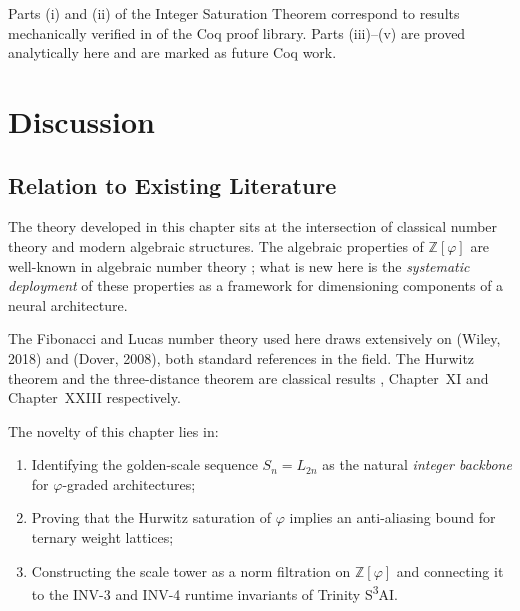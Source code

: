 \noindent
{}

\medskip
\noindent
Parts (i) and (ii) of the Integer Saturation Theorem correspond to
results mechanically verified in 
of the Coq proof library.  Parts (iii)–(v) are proved analytically
here and are marked as future Coq work.

\section{Discussion}
\label{sec:gs-discussion}

\subsection{Relation to Existing Literature}
\label{subsec:gs-literature}

The theory developed in this chapter sits at the intersection of
classical number theory and modern algebraic structures.  The
algebraic properties of \(\mathbb{Z}[\varphi]\) are well-known in
algebraic number theory \cite{ireland_rosen,hardy_wright}; what is
new here is the \emph{systematic deployment} of these properties
as a framework for dimensioning components of a neural architecture.

The Fibonacci and Lucas number theory used here draws extensively on
\cite{koshy_fib_lucas} (Wiley, 2018) and \cite{vajda_fib_lucas}
(Dover, 2008), both standard references in the field.  The Hurwitz
theorem and the three-distance theorem are classical results
\cite{hardy_wright}, Chapter~XI and Chapter~XXIII respectively.

The novelty of this chapter lies in:
\begin{enumerate}
  \item Identifying the golden-scale sequence \(S_n = L_{2n}\) as
        the natural \emph{integer backbone} for \(\varphi\)-graded
        architectures;
  \item Proving that the Hurwitz saturation of \(\varphi\) implies
        an anti-aliasing bound for ternary weight lattices;
  \item Constructing the scale tower as a norm filtration on
        \(\mathbb{Z}[\varphi]\) and connecting it to the INV-3 and
        INV-4 runtime invariants of Trinity S\textsuperscript{3}AI.
\end{enumerate}

